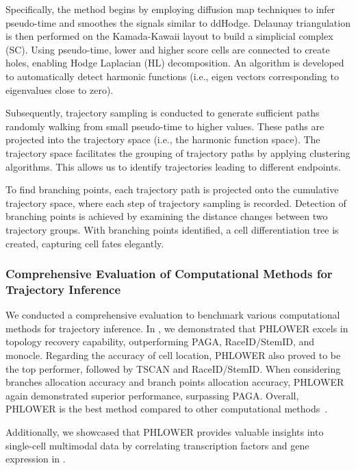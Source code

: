 Specifically, the method begins by employing diffusion map techniques to infer pseudo-time and smoothes the signals similar to ddHodge. Delaunay triangulation is then performed on the Kamada-Kawaii layout to build a simplicial complex (SC). Using pseudo-time, lower and higher score cells are connected to create holes, enabling Hodge Laplacian (HL) decomposition. An algorithm is developed to automatically detect harmonic functions (i.e., eigen vectors corresponding to eigenvalues close to zero).

Subsequently, trajectory sampling is conducted to generate sufficient paths randomly walking from small pseudo-time to higher values. These paths are projected into the trajectory space (i.e., the harmonic function space). The trajectory space facilitates the grouping of trajectory paths by applying clustering algorithms. This allows us to identify trajectories leading to different endpoints.

To find branching points, each trajectory path is projected onto the cumulative trajectory space, where each step of trajectory sampling is recorded. Detection of branching points is achieved by examining the distance changes between two trajectory groups. With branching points identified, a cell differentiation tree is created, capturing cell fates elegantly.



\subsubsection{Comprehensive Evaluation of Computational Methods for Trajectory Inference}
We conducted a comprehensive evaluation to benchmark various computational methods for trajectory inference. In , we demonstrated that PHLOWER excels in topology recovery capability, outperforming PAGA, RaceID/StemID, and monocle. Regarding the accuracy of cell location, PHLOWER also proved to be the top performer, followed by TSCAN and RaceID/StemID. When considering branches allocation accuracy and branch points allocation accuracy, PHLOWER again demonstrated superior performance, surpassing PAGA. Overall, PHLOWER is the best method compared to other computational methods~\citep{duverle2016celltree,albergante2020ElPiGraph,cao2019monocle3,herring2018pCreode,grun2016stemid,guo2017slice,street2018slingshot,chen2019stream,ji2016tscan}.

Additionally, we showcased that PHLOWER provides valuable insights into single-cell multimodal data by correlating transcription factors and gene expression in .


